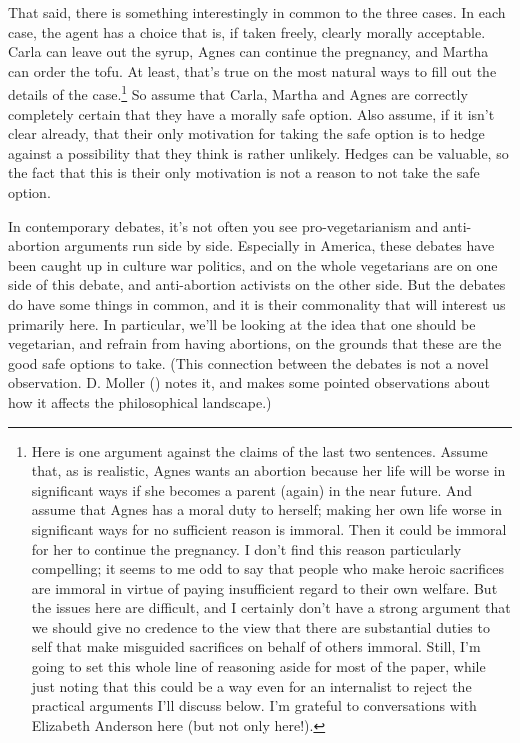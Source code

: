 \documentclass[
  10pt,
  letterpaper,
  DIV=11,
  numbers=noendperiod,
  twoside]{scrartcl}
\begin{document}
That said, there is something interestingly in common to the three
cases. In each case, the agent has a choice that is, if taken freely,
clearly morally acceptable. Carla can leave out the syrup, Agnes can
continue the pregnancy, and Martha can order the tofu. At least, that's
true on the most natural ways to fill out the details of the
case.\footnote{Here is one argument against the claims of the last two
  sentences. Assume that, as is realistic, Agnes wants an abortion
  because her life will be worse in significant ways if she becomes a
  parent (again) in the near future. And assume that Agnes has a moral
  duty to herself; making her own life worse in significant ways for no
  sufficient reason is immoral. Then it could be immoral for her to
  continue the pregnancy. I don't find this reason particularly
  compelling; it seems to me odd to say that people who make heroic
  sacrifices are immoral in virtue of paying insufficient regard to
  their own welfare. But the issues here are difficult, and I certainly
  don't have a strong argument that we should give no credence to the
  view that there are substantial duties to self that make misguided
  sacrifices on behalf of others immoral. Still, I'm going to set this
  whole line of reasoning aside for most of the paper, while just noting
  that this could be a way even for an internalist to reject the
  practical arguments I'll discuss below. I'm grateful to conversations
  with Elizabeth Anderson here (but not only here!).} So assume that
Carla, Martha and Agnes are correctly completely certain that they have
a morally safe option. Also assume, if it isn't clear already, that
their only motivation for taking the safe option is to hedge against a
possibility that they think is rather unlikely. Hedges can be valuable,
so the fact that this is their only motivation is not a reason to not
take the safe option.

In contemporary debates, it's not often you see pro-vegetarianism and
anti-abortion arguments run side by side. Especially in America, these
debates have been caught up in culture war politics, and on the whole
vegetarians are on one side of this debate, and anti-abortion activists
on the other side. But the debates do have some things in common, and it
is their commonality that will interest us primarily here. In
particular, we'll be looking at the idea that one should be vegetarian,
and refrain from having abortions, on the grounds that these are the
good safe options to take. (This connection between the debates is not a
novel observation. D. Moller ()
notes it, and makes some pointed observations about how it affects the
philosophical landscape.)
\end{document}

